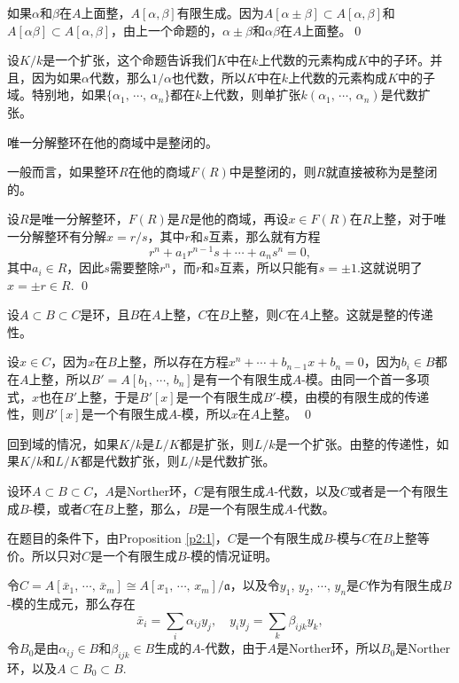 \proof 如果$\alpha$和$\beta$在$A$上面整，$A[\alpha,\beta]$有限生成。因为$A[\alpha\pm\beta]\subset A[\alpha,\beta]$和$A[\alpha\beta]\subset A[\alpha,\beta]$，由上一个命题的，$\alpha\pm\beta$和$\alpha\beta$在$A$上面整。\qed

设$K/k$是一个扩张，这个命题告诉我们$K$中在$k$上代数的元素构成$K$中的子环。并且，因为如果$\alpha$代数，那么$1/\alpha$也代数，所以$K$中在$k$上代数的元素构成$K$中的子域。特别地，如果$\{\alpha_1,\,\cdots,\,\alpha_n\}$都在$k$上代数，则单扩张$k(\alpha_1,\,\cdots,\,\alpha_n)$是代数扩张。

\para 唯一分解整环在他的商域中是整闭的。

一般而言，如果整环$R$在他的商域$F(R)$中是整闭的，则$R$就直接被称为是整闭的。

\proof 
	设$R$是唯一分解整环，$F(R)$是$R$是他的商域，再设$x\in F(R)$在$R$上整，对于唯一分解整环有分解$x=r/s$，其中$r$和$s$互素，那么就有方程
	\[
		r^n+a_1r^{n-1}s+\cdots+a_n s^n=0,
	\]
	其中$a_i\in R$，因此$s$需要整除$r^n$，而$r$和$s$互素，所以只能有$s=\pm 1$.这就说明了$x=\pm r\in R$.
\qed

\pro 设$A\subset B\subset C$是环，且$B$在$A$上整，$C$在$B$上整，则$C$在$A$上整。这就是整的传递性。

\proof 
	设$x\in C$，因为$x$在$B$上整，所以存在方程$x^n+\cdots+b_{n-1}x+b_n=0$，因为$b_i\in B$都在$A$上整，所以$B'=A[b_1,\,\cdots,\,b_n]$是有一个有限生成$A$-模。由同一个首一多项式，$x$也在$B'$上整，于是$B'[x]$是一个有限生成$B'$-模，由模的有限生成的传递性，则$B'[x]$是一个有限生成$A$-模，所以$x$在$A$上整。
\qed

回到域的情况，如果$K/k$是$L/K$都是扩张，则$L/k$是一个扩张。由整的传递性，如果$K/k$和$L/K$都是代数扩张，则$L/k$是代数扩张。

\pro 设环$A\subset B\subset C$，$A$是Norther环，$C$是有限生成$A$-代数，以及$C$或者是一个有限生成$B$-模，或者$C$在$B$上整，那么，$B$是一个有限生成$A$-代数。
	\label{p:2.4}

\proof 
	在题目的条件下，由Proposition \eqref{p2:1}，$C$是一个有限生成$B$-模与$C$在$B$上整等价。所以只对$C$是一个有限生成$B$-模的情况证明。

	令$C=A[\bar{x}_1,\,\cdots,\,\bar{x}_m]\cong A[x_1,\,\cdots,\,x_m]/\mathfrak{a}$，以及令$y_1$, $y_2$, $\cdots$, $y_n$是$C$作为有限生成$B$-模的生成元，那么存在
	\begin{equation}
		\bar{x}_i=\sum_i\alpha_{ij}y_j,\quad y_iy_j=\sum_{k}\beta_{ijk}y_k,
	\end{equation}
	令$B_0$是由$\alpha_{ij}\in B$和$\beta_{ijk}\in B$生成的$A$-代数，由于$A$是Norther环，所以$B_0$是Norther环，以及$A\subset B_0 \subset B$.


